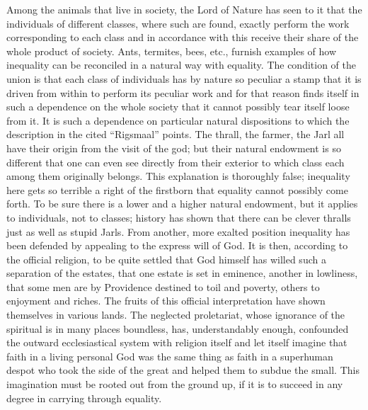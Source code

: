 \documentclass[12pt,a4paper,openany]{book}
\newcommand{\opage}[1]{\marginnote{\footnotesize\textit{[#1]}}}
\newcounter{lect}
\begin{document}
Among the animals that live in society, the Lord of Nature
has seen to it that the individuals of different classes,
\setcounter{footnote}{0}%
\opage{148}where such are found, exactly perform the work
corresponding to each class and in accordance with this receive
their share of the whole product of society. Ants,
termites, bees, etc., furnish examples of how
inequality can be reconciled in a natural way with
equality. The condition of the union is that each class of
individuals has by nature so peculiar a stamp
that it is driven from within to perform its peculiar
work and for that reason finds itself in such a dependence
on the whole society that it cannot possibly tear itself
loose from it. It is such a dependence on particular
natural dispositions to which the description in the cited
``Rigsmaal'' points. The thrall, the farmer, the Jarl all
have their origin from the visit of the god; but their
natural endowment is so different that one can even
see directly from their exterior to which class each
among them originally belongs. This explanation
is thoroughly false; inequality here gets so terrible a
right of the firstborn that equality cannot possibly come forth.
To be sure there is a lower and a higher natural endowment, but it
applies to individuals, not to classes; history has shown
that there can be clever thralls just as well as stupid
Jarls. From another, more exalted position inequality has been
defended by appealing to the express
will of God. It is then, according to the official
religion, to be quite settled that God himself has willed
such a separation of the estates, that one estate is set
in eminence, another in lowliness, that some men are
by Providence destined to toil and poverty, others to
enjoyment and riches. The fruits of this official interpretation
have shown themselves in various lands. The neglected
proletariat, whose ignorance of the spiritual
\setcounter{footnote}{0}%
\opage{149}is in many places boundless, has, understandably enough,
confounded the outward ecclesiastical system with religion
itself and let itself imagine that faith in a living
personal God was the same thing as faith in a superhuman
despot who took the side of the great and
helped them to subdue the small. This imagination
must be rooted out from the ground up, if it is to
succeed in any degree in carrying through equality.
\end{document}
